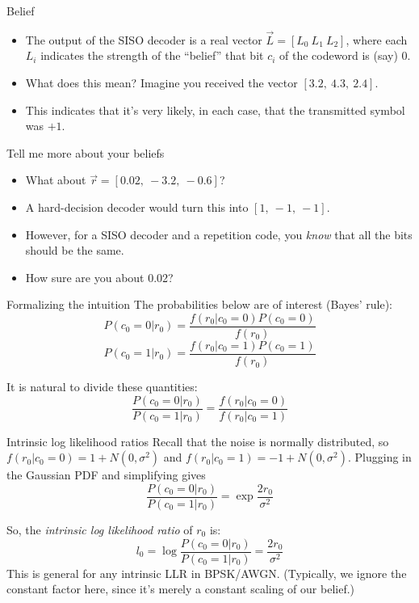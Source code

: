 \documentclass[aspectratio=1610, 10pt]{beamer}
\begin{document}
\begin{frame}[label={sec:org4ad3b76}]{Belief}
\begin{itemize}
\item The output of the SISO decoder is a real vector \(\vec{L} =
  [L_{0}~L_1~L_2]\), where each \(L_i\) indicates the strength of the ``belief''
that bit \(c_i\) of the codeword is (say) 0.
\item What does this mean? Imagine you received the vector \([3.2,~4.3,~2.4]\).
\item This indicates that it's very likely, in each case, that the
transmitted symbol was \(+1\).
\end{itemize}
\end{frame}

\begin{frame}[label={sec:org52e8b01}]{Tell me more about your beliefs}
\begin{itemize}
\item What about \(\vec{r} = [0.02,~-3.2,~-0.6]\)?
\item A hard-decision decoder would turn this into \([1,~-1,~-1]\).
\item However, for a SISO decoder and a repetition code, you \emph{know} that
all the bits should be the same.
\item How sure are you about 0.02?
\end{itemize}
\end{frame}

\begin{frame}[label={sec:orgfb00f02}]{Formalizing the intuition}
The probabilities below are of interest (Bayes' rule):
$$P(c_0=0 | r_0) = \frac{f(r_0 | c_0=0)P(c_0=0)}{f(r_0)}$$
$$P(c_0=1 | r_0) = \frac{f(r_0 | c_0=1)P(c_0=1)}{f(r_0)}$$

It is natural to divide these quantities:
$$\frac{P(c_0=0 | r_0)}{P(c_0=1 | r_0)} = \frac{f(r_0 |
c_0=0)}{f(r_0 | c_0=1)}$$
\end{frame}

\begin{frame}[label={sec:org1fce1da}]{Intrinsic log likelihood ratios}
Recall that the noise is normally distributed, so \(f(r_0|c_0=0) = 1 +
N(0, \sigma^2)\) and \(f(r_0|c_0=1)= -1 + N(0, \sigma^2)\). Plugging in
the Gaussian PDF and simplifying gives
$$\frac{P(c_0=0 | r_0)}{P(c_0=1 | r_0)} = \exp{\frac{2r_0}{\sigma^2}}$$

So, the \emph{intrinsic log likelihood ratio} of \(r_0\) is:
$$l_0 = \log{\frac{P(c_0=0 | r_0)}{P(c_0=1 | r_0)}} = \frac{2r_0}{\sigma^2}$$
This is general for any intrinsic LLR in BPSK/AWGN.
(Typically, we ignore the constant factor here, since it's merely a
constant scaling of our belief.)
\end{frame}
\end{document}
